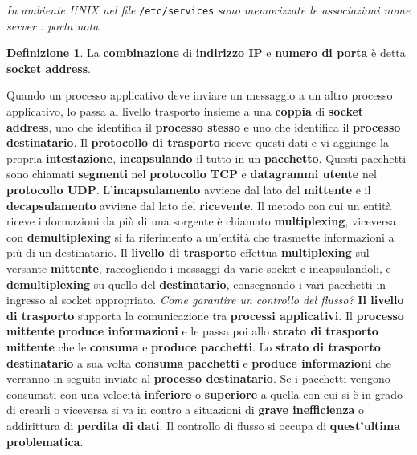 \documentclass[11pt,a4paper]{article}
\theoremstyle{definition}
\newtheorem{definition}{Definizione}[section]
\begin{document}
\textit{In ambiente UNIX nel file} \texttt{/etc/services} \textit{sono memorizzate le associazioni nome server : porta nota}.
\theoremstyle{definition}
\begin{definition}
	La \textbf{combinazione} di \textbf{indirizzo IP} e \textbf{numero di porta} è detta \textbf{socket address}.
\end{definition}
Quando un processo applicativo deve inviare un messaggio a un altro processo applicativo, lo passa al livello trasporto insieme a una \textbf{coppia} di \textbf{socket address}, uno che identifica il \textbf{processo stesso} e uno che identifica il \textbf{processo destinatario}. Il \textbf{protocollo di trasporto} riceve questi dati e vi aggiunge la propria \textbf{intestazione}, \textbf{incapsulando} il tutto in un \textbf{pacchetto}. Questi pacchetti sono chiamati \textbf{segmenti} nel \textbf{protocollo TCP} e \textbf{datagrammi utente} nel \textbf{protocollo UDP}. L'\textbf{incapsulamento} avviene dal lato del \textbf{mittente} e il \textbf{decapsulamento} avviene dal lato del \textbf{ricevente}.
\newline\newline
Il metodo con cui un entità riceve informazioni da più di una sorgente è chiamato \textbf{multiplexing}, viceversa con \textbf{demultiplexing} si fa riferimento a un'entità che trasmette informazioni a più di un destinatario. Il \textbf{livello di trasporto} effettua \textbf{multiplexing} sul versante \textbf{mittente}, raccogliendo i messaggi da varie socket e incapsulandoli, e \textbf{demultiplexing} su quello del \textbf{destinatario}, consegnando i vari pacchetti in ingresso al socket appropriato.\newline\newline
\textit{Come garantire un controllo del flusso?}\newline\newline
\textbf{Il livello di trasporto} supporta la comunicazione tra \textbf{processi applicativi}.  Il \textbf{processo mittente} \textbf{produce informazioni} e le passa poi allo \textbf{strato di trasporto mittente} che le \textbf{consuma} e \textbf{produce pacchetti}. Lo \textbf{strato di trasporto destinatario} a sua volta \textbf{consuma pacchetti} e \textbf{produce informazioni} che verranno in seguito inviate al \textbf{processo destinatario}. Se i pacchetti vengono consumati con una velocità \textbf{inferiore} o \textbf{superiore} a quella con cui si è in grado di crearli o viceversa si va in contro a situazioni di \textbf{grave inefficienza} o addirittura di \textbf{perdita di dati}. Il controllo di flusso si occupa di \textbf{quest'ultima problematica}.
\end{document}
